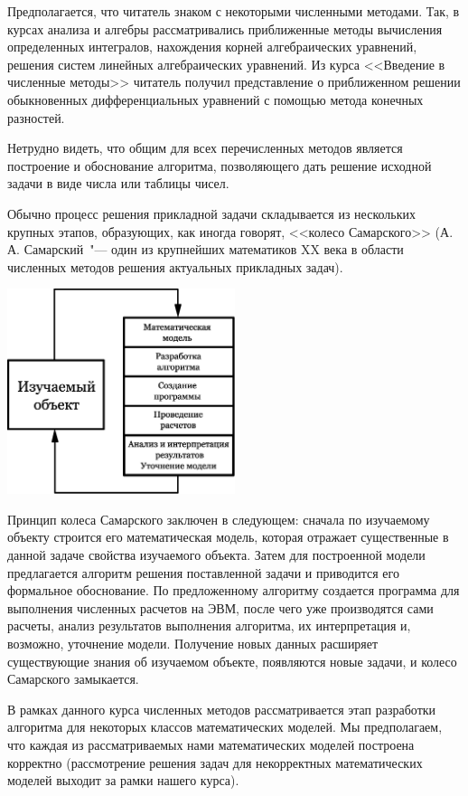 \documentclass[11pt,a4paper,twoside]{report}
\numberwithin{equation}{section}
\theoremstyle{definition}
\theoremstyle{plain}
\begin{document}
Предполагается, что читатель знаком с некоторыми численными методами. Так, в курсах
анализа и алгебры рассматривались приближенные методы вычисления определенных
интегралов, нахождения корней алгебраических уравнений, решения систем линейных
алгебраических уравнений. Из курса <<Введение в численные методы>> читатель
получил представление о приближенном решении обыкновенных дифференциальных уравнений
с помощью метода конечных разностей.

Нетрудно видеть, что общим для всех перечисленных методов является построение и
обоснование алгоритма, позволяющего дать решение исходной задачи в виде числа или
таблицы чисел.

Обычно процесс решения прикладной задачи складывается из нескольких крупных этапов,
образующих, как иногда говорят, <<колесо Самарского>> (А.\,А. Самарский~"--- один из
крупнейших математиков XX века в области численных методов решения актуальных
прикладных задач).
%
\begin{center}
    \includegraphics[width=0.5\textwidth]{circle.eps}\\
\end{center}
%

Принцип колеса Самарского заключен в следующем: сначала по изучаемому
объекту строится его математическая модель, которая отражает существенные в
данной задаче свойства изучаемого объекта. Затем для построенной модели
предлагается алгоритм решения поставленной задачи и приводится его формальное
обоснование. По предложенному алгоритму создается программа для выполнения
численных расчетов на ЭВМ, после чего уже производятся сами расчеты, анализ
результатов выполнения алгоритма, их интерпретация и, возможно, уточнение
модели. Получение новых данных расширяет существующие знания об изучаемом
объекте, появляются новые задачи, и колесо Самарского замыкается.

В рамках данного курса численных методов рассматривается этап разработки
алгоритма для некоторых классов математических моделей. Мы предполагаем, что
каждая из рассматриваемых нами математических моделей построена корректно
(рассмотрение решения задач для некорректных математических моделей выходит
за рамки нашего курса).
\end{document}
